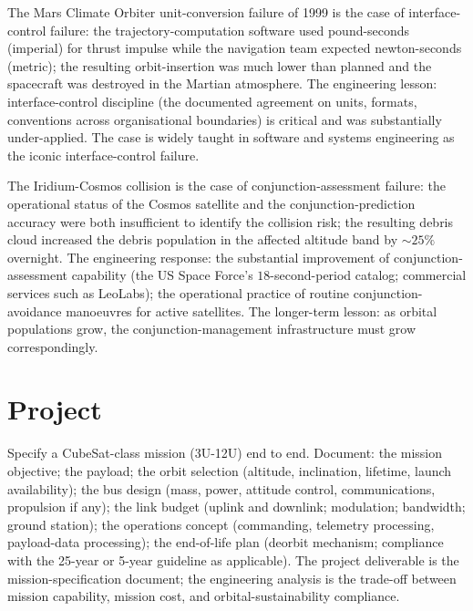 The Mars Climate Orbiter unit-conversion failure of 1999 \cite{acc:nasa-mco-mib} is the case of interface-control failure: the trajectory-computation software used pound-seconds (imperial) for thrust impulse while the navigation team expected newton-seconds (metric); the resulting orbit-insertion was much lower than planned and the spacecraft was destroyed in the Martian atmosphere. The engineering lesson: interface-control discipline (the documented agreement on units, formats, conventions across organisational boundaries) is critical and was substantially under-applied. The case is widely taught in software and systems engineering as the iconic interface-control failure.

The Iridium-Cosmos collision \cite{paper:weeden-iridium-cosmos-2010} is the case of conjunction-assessment failure: the operational status of the Cosmos satellite and the conjunction-prediction accuracy were both insufficient to identify the collision risk; the resulting debris cloud increased the debris population in the affected altitude band by $\sim 25\%$ overnight. The engineering response: the substantial improvement of conjunction-assessment capability (the US Space Force's $18$-second-period catalog; commercial services such as LeoLabs); the operational practice of routine conjunction-avoidance manoeuvres for active satellites. The longer-term lesson: as orbital populations grow, the conjunction-management infrastructure must grow correspondingly.

\section{Project}

\begin{project}
Specify a CubeSat-class mission (3U-12U) end to end. Document: the mission objective; the payload; the orbit selection (altitude, inclination, lifetime, launch availability); the bus design (mass, power, attitude control, communications, propulsion if any); the link budget (uplink and downlink; modulation; bandwidth; ground station); the operations concept (commanding, telemetry processing, payload-data processing); the end-of-life plan (deorbit mechanism; compliance with the 25-year or 5-year guideline as applicable). The project deliverable is the mission-specification document; the engineering analysis is the trade-off between mission capability, mission cost, and orbital-sustainability compliance.
\end{project}

